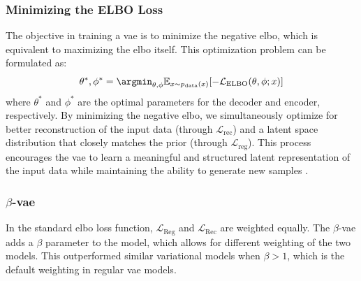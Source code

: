 \subsubsection{Minimizing the ELBO Loss}
The objective in training a \acrshort{vae} is to minimize the negative \acrshort{elbo}, which is equivalent to maximizing the \acrshort{elbo} itself. This optimization problem can be formulated as:
\begin{equation}
    \theta^*, \phi^* = \argmin_{\theta, \phi} \mathbb{E}_{x \sim p_{\text{data}}(x)}[-\mathcal{L}_{\text{ELBO}}(\theta, \phi; x)]
\end{equation}
where $\theta^*$ and $\phi^*$ are the optimal parameters for the decoder and encoder, respectively. By minimizing the negative \acrshort{elbo}, we simultaneously optimize for better reconstruction of the input data (through $\mathcal{L}_{\text{rec}}$) and a latent space distribution that closely matches the prior (through $\mathcal{L}_{\text{reg}}$). This process encourages the \acrshort{vae} to learn a meaningful and structured latent representation of the input data while maintaining the ability to generate new samples \cite{kingma2022autoencodingvariationalbayes}.
\subsubsection{$\beta$-\acrshort{vae}}
In the standard \acrshort{elbo} loss function, $\mathcal{L}_{\text{Reg}}$ and $\mathcal{L}_{\text{Rec}}$ are weighted equally. The $\beta$-\acrshort{vae} \cite{higgins2017betavae} adds a $\beta$ parameter to the model, which allows for different weighting of the two models. This outperformed similar variational models when $\beta > 1$, which is the default weighting in regular \acrshort{vae} models.
